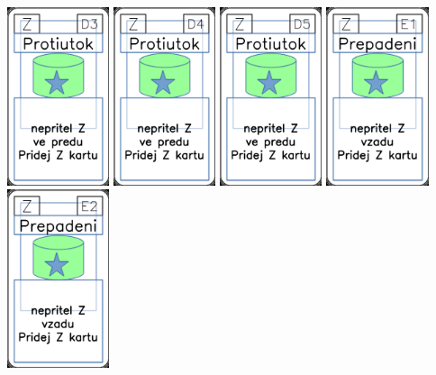 \documentclass[a4paper]{article}
\begin{document}
	\includegraphics[width=3.0cm]{img-5_47}
	\includegraphics[width=3.0cm]{img-5_48}
	\includegraphics[width=3.0cm]{img-5_49}
	\includegraphics[width=3.0cm]{img-5_50}
	\includegraphics[width=3.0cm]{img-5_51}
\end{document}
